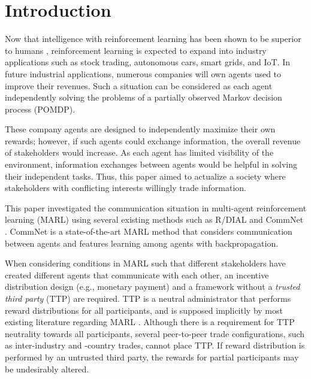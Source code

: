 \section{Introduction}

Now that intelligence with reinforcement learning has been shown to be superior to humans \citep{tesauro1995temporal,mnih2015human,silver2016mastering}, reinforcement learning is expected to expand into industry applications such as stock trading, autonomous cars, smart grids, and IoT. 
In future industrial applications, numerous companies will own agents used to improve their revenues.
Such a situation can be considered as each agent independently solving the problems of a partially observed Markov decision process (POMDP).

These company agents are designed to independently maximize their own rewards; 
however, if such agents could exchange information, the overall revenue of stakeholders would increase.
As each agent has limited visibility of the environment, information exchanges between agents would be helpful in solving their independent tasks.
Thus, this paper aimed to actualize a society where stakeholders with conflicting interests willingly trade information.

This paper investigated the communication situation in multi-agent reinforcement learning (MARL) using several existing methods such as R/DIAL \citep{foerster2016learning} and CommNet \citep{sukhbaatar2016learning}.
CommNet is a state-of-the-art MARL method that considers communication between agents 
and features learning among agents with backpropagation.

When considering conditions in MARL such that different stakeholders have created different agents that communicate with each other, an incentive distribution design (e.g., monetary payment) and a framework without a {\em trusted third party} (TTP) are required.
TTP is a neutral administrator that performs reward distributions for all participants, and is supposed implicitly by most existing literature regarding MARL \citep{agogino2006quicr,foerster2016learning,sukhbaatar2016learning}.
Although there is a requirement for TTP neutrality towards all participants,
several peer-to-peer trade configurations, such as inter-industry and -country trades, cannot place TTP.
If reward distribution is performed by an untrusted third party, the rewards for partial participants may be undesirably altered.


